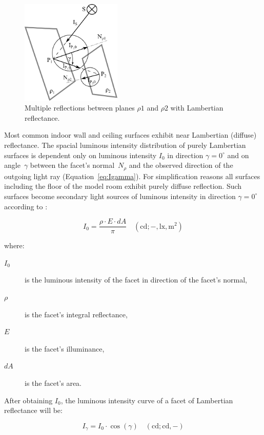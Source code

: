 \begin{figure}[htb]
  \centering
  \includegraphics[width=136pt]{diffuseReflection}
  \caption{Multiple reflections between planes $\rho1$ and $\rho2$ with Lambertian reflectance.}
  \label{fig:difRefl}
\end{figure}

Most common indoor wall and ceiling surfaces exhibit near Lambertian (diffuse) reflectance. The spacial luminous intensity distribution of purely Lambertian surfaces is dependent only on luminous intensity $I_{0}$ in direction $\gamma=0^{\circ}$ and on angle~$\gamma$ between the facet's normal~$N_{\rho}$ and the observed direction of the outgoing light ray (Equation~\ref{eq:Igamma}). For simplification reasons all surfaces including the floor of the model room exhibit purely diffuse reflection. Such surfaces become secondary light sources of luminous intensity in direction $\gamma=0^{\circ}$ according to \cite{Habel}:

\begin{equation}
I_{0}=\frac{\rho \cdot E \cdot dA}{\pi} \quad \mathrm{(cd;-,lx,m^{2})}
\label{eq:lumInt}
\end{equation}

where:
\begin{description}
	\item[$I_{0}$] is the luminous intensity of the facet in direction of the facet's normal,
	\item[$\rho$] is the facet's integral reflectance,
	\item[$E$] is the facet's illuminance,
	\item[$dA$] is the facet's area.
\end{description}

After obtaining $I_{0}$, the luminous intensity curve of a facet of Lambertian reflectance will be:

\begin{equation}
I_{\gamma}=I_{0} \cdot \cos(\gamma) \quad \mathrm{(cd;cd,-)}
\label{eq:Igamma}
\end{equation}

